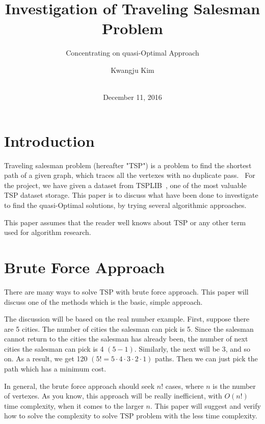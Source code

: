 \documentclass{acm_proc_article-sp}
\begin{document}
\title{Investigation of Traveling Salesman Problem}
\subtitle{Concentrating on quasi-Optimal Approach}

\author{
\alignauthor
Kwangju Kim\\
       \\
}

\date{December 11, 2016}


\maketitle


\section{Introduction}
\begin{flushleft}
Traveling salesman problem (hereafter "TSP") is a problem to find the shortest path of a given graph, which traces all the vertexes with no duplicate pass.~\cite{waterloo} For the project, we have given a dataset from TSPLIB~\cite{tsplib}, one of the most valuable TSP dataset storage. This paper is to discuss what have been done to investigate to find the quasi-Optimal solutions, by trying several algorithmic approaches.

This paper assumes that the reader well knows about TSP or any other term used for algorithm research.
\end{flushleft}

\section{Brute Force Approach}
\begin{flushleft}
There are many ways to solve TSP with brute force approach. This paper will discuss one of the methods which is the basic, simple approach.

The discussion will be based on the real number example. First, suppose there are 5 cities. The number of cities the salesman can pick is 5. Since the salesman cannot return to the cities the salesman has already been, the number of next cities the salesman can pick is 4 $(5-1)$. Similarly, the next will be 3, and so on. As a result, we get 120 $(5! = 5 \cdot 4 \cdot 3 \cdot 2 \cdot 1)$ paths. Then we can just pick the path which has a minimum cost.

In general, the brute force approach should seek $n!$ cases, where $n$ is the number of vertexes. As you know, this approach will be really inefficient, with $O(n!)$ time complexity, when it comes to the larger $n$. This paper will suggest and verify how to solve the complexity to solve TSP problem with the less time complexity.
\end{flushleft}
\end{document}
